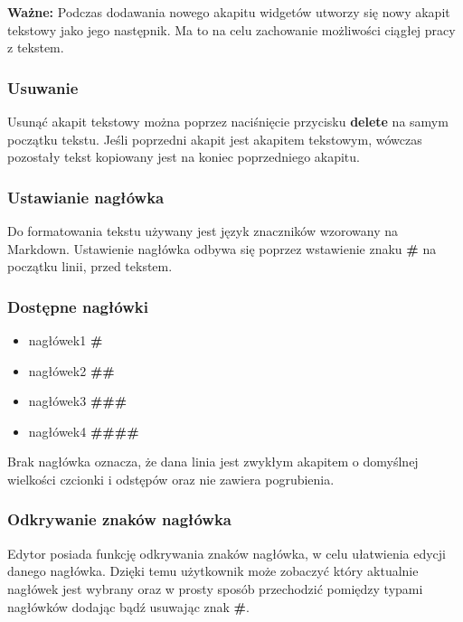 \textbf{Ważne:} Podczas dodawania nowego akapitu widgetów utworzy się nowy akapit tekstowy jako jego następnik. Ma to na celu zachowanie możliwości ciągłej pracy z tekstem.

\subsubsection{Usuwanie}

Usunąć akapit tekstowy można poprzez naciśnięcie przycisku \textbf{delete} na samym początku tekstu. Jeśli poprzedni akapit jest akapitem tekstowym, wówczas pozostały tekst kopiowany jest na koniec poprzedniego akapitu.

\subsubsection{Ustawianie nagłówka}

Do formatowania tekstu używany jest język znaczników wzorowany na Markdown. Ustawienie nagłówka odbywa się poprzez wstawienie znaku \textbf{\#} na początku linii, przed tekstem.

\subsubsection{Dostępne nagłówki}
\begin{itemize}
    \setlength\itemsep{0mm}
    \item nagłówek1 \textbf{\#}
    \item nagłówek2 \textbf{\#\#}
    \item nagłówek3 \textbf{\#\#\#}
    \item nagłówek4 \textbf{\#\#\#\#}
\end{itemize}

Brak nagłówka oznacza, że dana linia jest zwykłym akapitem o domyślnej wielkości czcionki i odstępów oraz nie zawiera pogrubienia.

\pagebreak

\subsubsection{Odkrywanie znaków nagłówka}

Edytor posiada funkcję odkrywania znaków nagłówka, w celu ułatwienia edycji danego nagłówka. Dzięki temu użytkownik może zobaczyć który aktualnie nagłówek jest wybrany oraz w prosty sposób przechodzić pomiędzy typami nagłówków dodając bądź usuwając znak \textbf{\#}.

